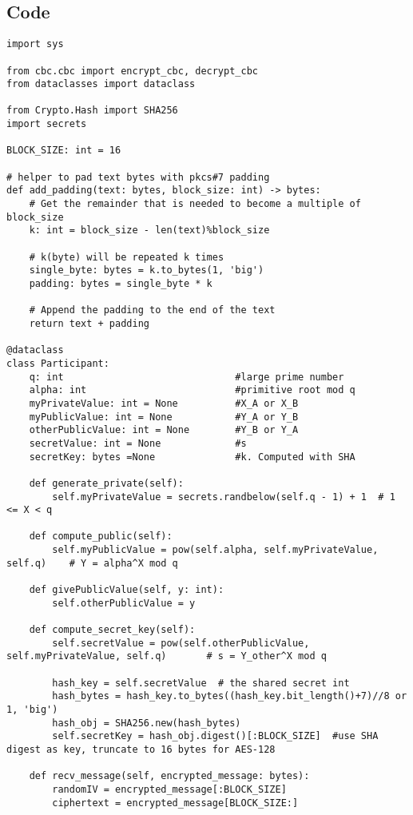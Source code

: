 \documentclass[11pt]{article}
\begin{document}
\subsection*{Code}

\begin{lstlisting}
import sys

from cbc.cbc import encrypt_cbc, decrypt_cbc
from dataclasses import dataclass

from Crypto.Hash import SHA256
import secrets

BLOCK_SIZE: int = 16

# helper to pad text bytes with pkcs#7 padding
def add_padding(text: bytes, block_size: int) -> bytes:
    # Get the remainder that is needed to become a multiple of block_size
    k: int = block_size - len(text)%block_size

    # k(byte) will be repeated k times
    single_byte: bytes = k.to_bytes(1, 'big')
    padding: bytes = single_byte * k

    # Append the padding to the end of the text 
    return text + padding 

@dataclass 
class Participant:
    q: int                              #large prime number
    alpha: int                          #primitive root mod q
    myPrivateValue: int = None          #X_A or X_B
    myPublicValue: int = None           #Y_A or Y_B
    otherPublicValue: int = None        #Y_B or Y_A
    secretValue: int = None             #s
    secretKey: bytes =None              #k. Computed with SHA

    def generate_private(self):
        self.myPrivateValue = secrets.randbelow(self.q - 1) + 1  # 1 <= X < q

    def compute_public(self):
        self.myPublicValue = pow(self.alpha, self.myPrivateValue, self.q)    # Y = alpha^X mod q

    def givePublicValue(self, y: int):
        self.otherPublicValue = y

    def compute_secret_key(self):
        self.secretValue = pow(self.otherPublicValue, self.myPrivateValue, self.q)       # s = Y_other^X mod q

        hash_key = self.secretValue  # the shared secret int
        hash_bytes = hash_key.to_bytes((hash_key.bit_length()+7)//8 or 1, 'big')
        hash_obj = SHA256.new(hash_bytes)
        self.secretKey = hash_obj.digest()[:BLOCK_SIZE]  #use SHA digest as key, truncate to 16 bytes for AES-128
    
    def recv_message(self, encrypted_message: bytes):
        randomIV = encrypted_message[:BLOCK_SIZE]
        ciphertext = encrypted_message[BLOCK_SIZE:]


\end{lstlisting}
\end{document}
